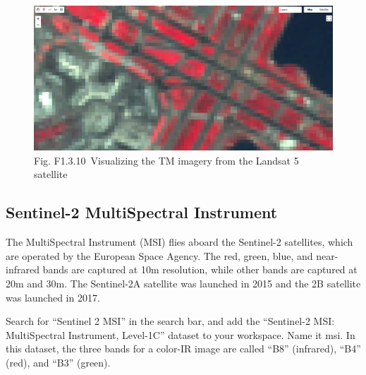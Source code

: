 \documentclass[
  letterpaper,
  DIV=11,
  numbers=noendperiod]{scrreprt}
\begin{document}
\begin{figure}

{\centering \includegraphics{./F1/image20.png}

}

\caption{Fig. F1.3.10~Visualizing the TM imagery from the Landsat 5
satellite}

\end{figure}

\hypertarget{sentinel-2-multispectral-instrument}{%
\subsection{Sentinel-2 MultiSpectral
Instrument}\label{sentinel-2-multispectral-instrument}}

The MultiSpectral Instrument (MSI) flies aboard the Sentinel-2
satellites, which are operated by the European Space Agency. The red,
green, blue, and near-infrared bands are captured at 10m resolution,
while other bands are captured at 20m and 30m. The Sentinel-2A satellite
was launched in 2015 and the 2B satellite was launched in 2017.

Search for ``Sentinel 2 MSI'' in the search bar, and add the
``Sentinel-2 MSI: MultiSpectral Instrument, Level-1C'' dataset to your
workspace. Name it msi. In this dataset, the three bands for a color-IR
image are called ``B8'' (infrared), ``B4'' (red), and ``B3'' (green).
\end{document}
